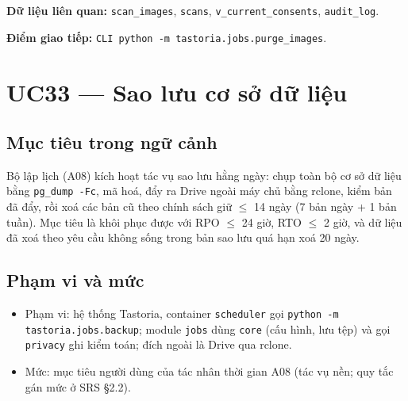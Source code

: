 \textbf{Dữ liệu liên quan:} {\small\texttt{scan\_\allowbreak{}\allowbreak{}images}}, {\small\texttt{scans}}, {\small\texttt{v\_\allowbreak{}\allowbreak{}current\_\allowbreak{}\allowbreak{}consents}}, {\small\texttt{audit\_\allowbreak{}\allowbreak{}log}}.

\textbf{Điểm giao tiếp:} {\small\texttt{CLI python -\allowbreak{}m tastoria.\allowbreak{}jobs.\allowbreak{}purge\_\allowbreak{}\allowbreak{}images}}.

\section{UC33 --- Sao lưu cơ sở dữ liệu}
\subsection{Mục tiêu trong ngữ cảnh}
Bộ lập lịch (A08) kích hoạt tác vụ sao lưu hằng ngày: chụp toàn bộ cơ sở dữ liệu bằng {\small\texttt{pg\_\allowbreak{}\allowbreak{}dump -\allowbreak{}Fc}}, mã hoá, đẩy ra Drive ngoài máy chủ bằng rclone, kiểm bản đã đẩy, rồi xoá các bản cũ theo chính sách giữ \ensuremath{\leq} 14 ngày (7 bản ngày + 1 bản tuần). Mục tiêu là khôi phục được với RPO \ensuremath{\leq} 24 giờ, RTO \ensuremath{\leq} 2 giờ, và dữ liệu đã xoá theo yêu cầu không sống trong bản sao lưu quá hạn xoá 20 ngày.

\subsection{Phạm vi và mức}
\begin{itemize}
\item Phạm vi: hệ thống Tastoria, container {\small\texttt{scheduler}} gọi {\small\texttt{python -\allowbreak{}m tastoria.\allowbreak{}jobs.\allowbreak{}backup}}; module {\small\texttt{jobs}} dùng {\small\texttt{core}} (cấu hình, lưu tệp) và gọi {\small\texttt{privacy}} ghi kiểm toán; đích ngoài là Drive qua rclone.
\item Mức: mục tiêu người dùng của tác nhân thời gian A08 (tác vụ nền; quy tắc gán mức ở SRS \S{}2.2).
\end{itemize}
